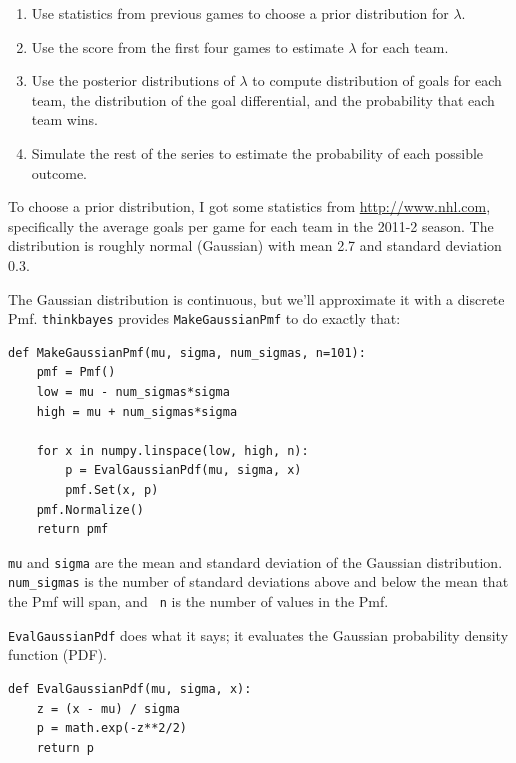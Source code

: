 \documentclass[12pt]{book}
\begin{document}
\begin{enumerate}

\item Use statistics from previous games to choose a prior
distribution for $\lambda$.

\item Use the score from the first four games to estimate $\lambda$
for each team.

\item Use the posterior distributions of $\lambda$ to compute 
distribution of goals for each team, the distribution of the
goal differential, and the probability that each team wins.

\item Simulate the rest of the series to estimate the probability
of each possible outcome.

\end{enumerate}

To choose a prior distribution, I got some statistics from
\url{http://www.nhl.com}, specifically the average goals per game
for each team in the 2011-2 season.  The distribution is roughly
normal (Gaussian) with mean 2.7 and standard deviation 0.3.

The Gaussian distribution is continuous, but we'll approximate it with
a discrete Pmf.  \verb"thinkbayes" provides \verb"MakeGaussianPmf" to
do exactly that:

\begin{verbatim}
def MakeGaussianPmf(mu, sigma, num_sigmas, n=101):
    pmf = Pmf()
    low = mu - num_sigmas*sigma
    high = mu + num_sigmas*sigma

    for x in numpy.linspace(low, high, n):
        p = EvalGaussianPdf(mu, sigma, x)
        pmf.Set(x, p)
    pmf.Normalize()
    return pmf
\end{verbatim}  

{\tt mu} and {\tt sigma} are the mean and standard deviation of the
Gaussian distribution.  \verb"num_sigmas" is the number of standard
deviations above and below the mean that the Pmf will span, and {\tt
  n} is the number of values in the Pmf.

\verb"EvalGaussianPdf" does what it says; it evaluates the
Gaussian probability density function (PDF).

\begin{verbatim}
def EvalGaussianPdf(mu, sigma, x):
    z = (x - mu) / sigma
    p = math.exp(-z**2/2)
    return p
\end{verbatim}  
\end{document}
